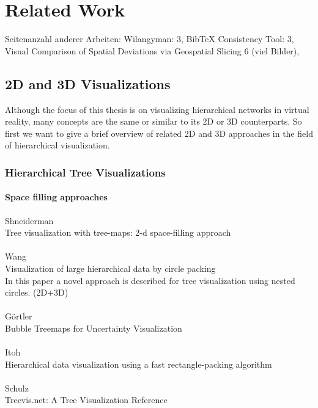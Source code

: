 \chapter{Related Work}
Seitenanzahl anderer Arbeiten: Wilangyman: 3, BibTeX Consistency Tool: 3, Visual Comparison of Spatial Deviations via Geospatial Slicing 6 (viel Bilder), 

\section{2D and 3D Visualizations}

Although the focus of this thesis is on visualizing hierarchical networks in virtual reality, many concepts are the same or similar to its 2D or 3D counterparts. So first we want to give a brief overview of related 2D and 3D approaches in the field of hierarchical visualization.

\subsection{Hierarchical Tree Visualizations}

\subsubsection{Space filling approaches}
Shneiderman \\
Tree visualization with tree-maps: 2-d space-filling approach\\
\\
Wang\\
Visualization of large hierarchical data by circle packing\\
In this paper a novel approach is described for tree visualization using nested circles. (2D+3D)\\
\\
Görtler\\
Bubble Treemaps for Uncertainty Visualization\\
\\
Itoh\\
Hierarchical data visualization using a fast rectangle-packing algorithm\\
\\
Schulz\\
Treevis.net: A Tree Visualization Reference
